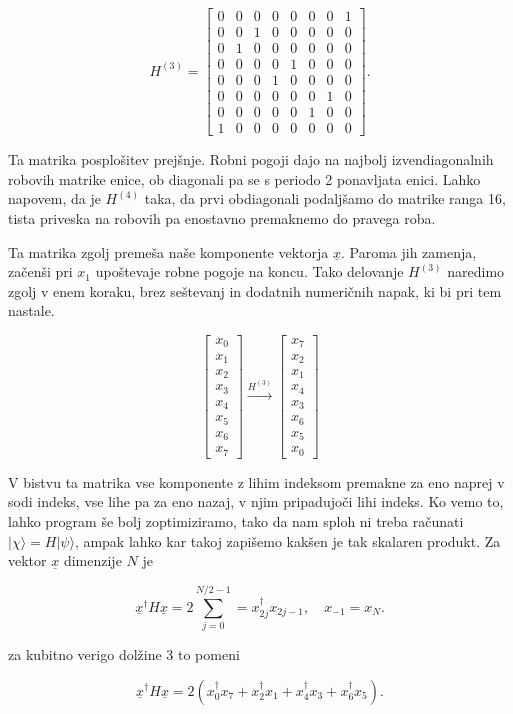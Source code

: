 \documentclass[a4 paper, 12pt]{article}
\begin{document}
\begin{equation}
	H^{(3)} = \begin{bmatrix}
	0 & 0 & 0 & 0 & 0 & 0 & 0 & 1 \\
	0 & 0 & 1 & 0 & 0 & 0 & 0 & 0 \\
	0 & 1 & 0 & 0 & 0 & 0 & 0 & 0 \\
	0 & 0 & 0 & 0 & 1 & 0 & 0 & 0 \\
	0 & 0 & 0 & 1 & 0 & 0 & 0 & 0 \\
	0 & 0 & 0 & 0 & 0 & 0 & 1 & 0 \\
	0 & 0 & 0 & 0 & 0 & 1 & 0 & 0 \\
	1 & 0 & 0 & 0 & 0 & 0 & 0 & 0
	\end{bmatrix}.
\end{equation}

Ta matrika posplošitev prejšnje. Robni pogoji dajo na najbolj izvendiagonalnih robovih matrike enice, ob diagonali pa
se s periodo 2 ponavljata enici. Lahko napovem, da je $H^{(4)}$ taka, da prvi obdiagonali podaljšamo do matrike ranga
16, tista priveska na robovih pa enostavno premaknemo do pravega roba.

Ta matrika zgolj premeša naše komponente vektorja $\underline{x}$. Paroma jih zamenja, začenši pri $x_1$ upoštevaje
robne pogoje na koncu. Tako delovanje $H^{(3)}$ naredimo zgolj v enem koraku, brez seštevanj in dodatnih numeričnih
napak, ki bi pri tem nastale.

\[
	\begin{bmatrix}
	x_0 \\
	x_1 \\
	x_2 \\
	x_3 \\
	x_4 \\
	x_5 \\
	x_6 \\
	x_7
	\end{bmatrix} \stackrel{H^{(3)}}{\longrightarrow}
	\begin{bmatrix}
	x_7 \\
	x_2 \\
	x_1 \\
	x_4 \\
	x_3 \\
	x_6 \\
	x_5 \\
	x_0
	\end{bmatrix}
\]

V bistvu ta matrika vse komponente z lihim indeksom premakne za eno naprej v sodi indeks, vse lihe pa za eno nazaj,
v njim pripadujoči lihi indeks. Ko vemo to, lahko program še bolj zoptimiziramo, tako da nam sploh ni treba računati
$|\chi\rangle = H |\psi\rangle$, ampak lahko kar takoj zapišemo kakšen je tak skalaren produkt. Za vektor
$\underline{x}$ dimenzije $N$ je

\begin{equation}
	\underline{x}^\dagger H \underline{x} = 2\sum_{j = 0}^{N/2 - 1} = x^\dagger_{2j}x_{2j-1}, \quad x_{-1} = x_N.
\end{equation}

za kubitno verigo dolžine 3 to pomeni

\[
	\underline{x}^\dagger H \underline{x} = 2 (x_0^\dagger x_7 + x_2^\dagger x_1 + x_4^\dagger x_3 + x_6^\dagger x_5).
\]
\end{document}

